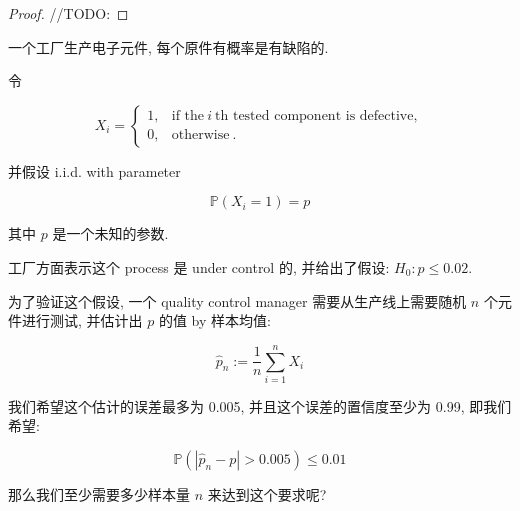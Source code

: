 \documentclass{qlnotes-export}
\begin{document}
\begin{proof}

//TODO:

\end{proof}

\begin{example}

一个工厂生产电子元件, 每个原件有概率是有缺陷的.

令

\[X_{i} = \left\{ \begin{matrix}
{1,} & {\text{if the}\ i\ \text{th tested component is defective},} \\
{0,} & {\text{otherwise}\ .}
\end{matrix} \right.\]

并假设 i.i.d. with parameter

\[{\mathbb{P}}(X_{i} = 1) = p\]

其中 \(p\) 是一个未知的参数.

工厂方面表示这个 process 是 under control 的, 并给出了假设: \(H_{0}:p \leq 0.02\).

为了验证这个假设, 一个 quality control manager 需要从生产线上需要随机 \(n\) 个元件进行测试, 并估计出 \(p\) 的值 by 样本均值:

\[{\widehat{p}}_{n} := \frac{1}{n}\sum\limits_{i = 1}^{n}X_{i}\]

我们希望这个估计的误差最多为 0.005, 并且这个误差的置信度至少为 0.99, 即我们希望:

\[{\mathbb{P}}\left( {\left| {{\widehat{p}}_{n} - p} \right| > 0.005} \right) \leq 0.01\]

那么我们至少需要多少样本量 \(n\) 来达到这个要求呢?

\end{example}
\end{document}
